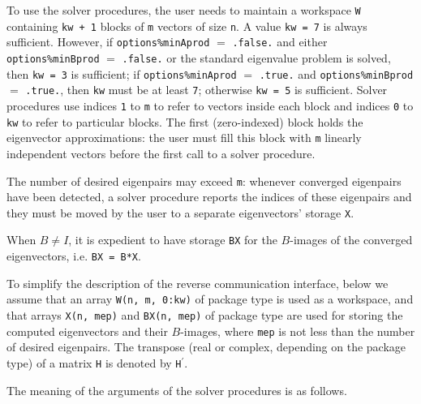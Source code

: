 \medskip
\noindent
To use the solver procedures,
the user needs to maintain a workspace {\tt W} containing
{\tt kw + 1} blocks of {\tt m} vectors of size {\tt n}.
A value {\tt kw = 7} is always sufficient. 
However, if {\tt options\%minAprod} $=$ {\tt .false.}
and either {\tt options\%minBprod} $=$ {\tt .false.} or 
the standard eigenvalue problem  is solved,
then {\tt kw = 3} is sufficient; 
if 
{\tt options\%minAprod} $=$ {\tt .true.} and
{\tt options\%minBprod} $=$ {\tt .true.},
then {\tt kw} must be at least {\tt 7};
otherwise {\tt kw = 5} is sufficient.
Solver procedures
use indices {\tt 1} to {\tt m} 
to refer to vectors inside each block
and indices {\tt 0} to {\tt kw} 
to refer to particular blocks.
The first (zero-indexed) block holds the eigenvector approximations:
the user must fill this block with 
{\tt m} linearly independent vectors before the first call
to a solver procedure.

The number of desired eigenpairs may exceed {\tt m}:
whenever converged eigenpairs have been detected,
a solver procedure reports the indices of these eigenpairs
and they must be moved by the user
to a separate eigenvectors' storage {\tt X}.

When $B \ne I$,
it is expedient to 
have %
storage {\tt BX}
for the $B$-images of the converged eigenvectors,
i.e. {\tt BX = B*X}.

To simplify the description of the %
reverse communication interface,
below we assume that an array
{\tt W(n,~m,~0:kw)} of package type
is used as a workspace,
and that arrays {\tt X(n, mep)} and {\tt BX(n, mep)} of package type
are used for storing the computed eigenvectors
and their $B$-images,
where {\tt mep} is not less than the number of desired eigenpairs.
The transpose (real or complex, depending on the package type)
of a matrix {\tt H} 
is denoted by {\tt H}$^\prime$.

\medskip
\noindent
The meaning of the arguments of the solver procedures is as follows.

